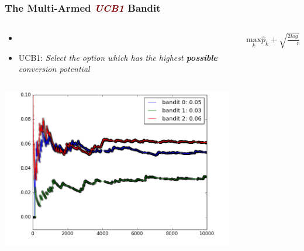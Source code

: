 \documentclass[xcolor={dvipsnames}]{beamer}
\begin{document}
\frame
{
\frametitle{The Multi-Armed \textcolor{Maroon}{\emph{UCB1}} Bandit}


\vspace{.5em}
\begin{columns}
   \begin{column}{0.5\textwidth}
\setlength{\leftmargini}{9pt}
\vspace{-25pt}
\begin{itemize}
\item[] 
\item[] UCB1: \emph{Select the option which has the highest \textbf{possible} conversion potential} 
\vspace{3.85em}
\end{itemize}

\end{column}
\begin{column}{0.5\textwidth}

\vspace{-3.4em}
$\underset{k}{\text{max}} \hat p_k + \sqrt{\frac{2 log \sum n_k}{n_k}}$\\
\text{}\\
\\
\vspace{1em}
    
    \end{column}
\end{columns}


\vspace{-.46in}
\hspace*{.5em} \includegraphics[height=2.765in]{stuff/mba_ucb1.png}


}
\end{document}
